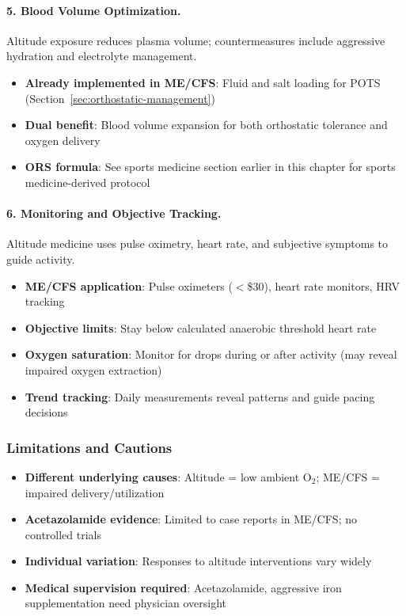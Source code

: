 \paragraph{5. Blood Volume Optimization.}
Altitude exposure reduces plasma volume; countermeasures include aggressive hydration and electrolyte management.

\begin{itemize}
    \item \textbf{Already implemented in ME/CFS}: Fluid and salt loading for POTS (Section~\ref{sec:orthostatic-management})
    \item \textbf{Dual benefit}: Blood volume expansion for both orthostatic tolerance and oxygen delivery
    \item \textbf{ORS formula}: See sports medicine section earlier in this chapter for sports medicine-derived protocol
\end{itemize}

\paragraph{6. Monitoring and Objective Tracking.}
Altitude medicine uses pulse oximetry, heart rate, and subjective symptoms to guide activity.

\begin{itemize}
    \item \textbf{ME/CFS application}: Pulse oximeters ($<$\$30), heart rate monitors, HRV tracking
    \item \textbf{Objective limits}: Stay below calculated anaerobic threshold heart rate
    \item \textbf{Oxygen saturation}: Monitor for drops during or after activity (may reveal impaired oxygen extraction)
    \item \textbf{Trend tracking}: Daily measurements reveal patterns and guide pacing decisions
\end{itemize}

\subsubsection{Limitations and Cautions}

\begin{itemize}
    \item \textbf{Different underlying causes}: Altitude = low ambient O$_2$; ME/CFS = impaired delivery/utilization
    \item \textbf{Acetazolamide evidence}: Limited to case reports in ME/CFS; no controlled trials
    \item \textbf{Individual variation}: Responses to altitude interventions vary widely
    \item \textbf{Medical supervision required}: Acetazolamide, aggressive iron supplementation need physician oversight
\end{itemize}

